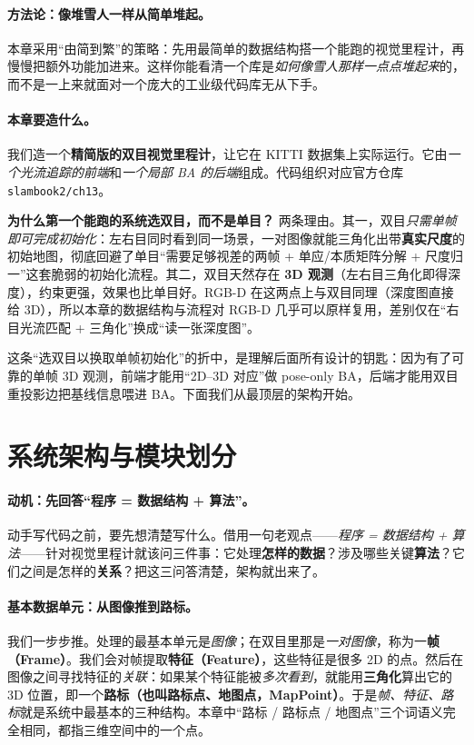 \paragraph{方法论：像堆雪人一样从简单堆起。}
本章采用“由简到繁”的策略：先用最简单的数据结构搭一个能跑的视觉里程计，再慢慢把额外功能加进来。这样你能看清一个库是\emph{如何像雪人那样一点点堆起来}的，而不是一上来就面对一个庞大的工业级代码库无从下手。

\paragraph{本章要造什么。}
我们造一个\textbf{精简版的双目视觉里程计}，让它在 KITTI 数据集上实际运行。它由\emph{一个光流追踪的前端}和\emph{一个局部 BA 的后端}组成。代码组织对应官方仓库 \texttt{slambook2/ch13}。

\begin{insight}
\textbf{为什么第一个能跑的系统选双目，而不是单目？}
两条理由。其一，双目\emph{只需单帧即可完成初始化}：左右目同时看到同一场景，一对图像就能三角化出带\textbf{真实尺度}的初始地图，彻底回避了单目“需要足够视差的两帧 + 单应/本质矩阵分解 + 尺度归一”这套脆弱的初始化流程。其二，双目天然存在 \textbf{3D 观测}（左右目三角化即得深度），约束更强，效果也比单目好。RGB-D 在这两点上与双目同理（深度图直接给 3D），所以本章的数据结构与流程对 RGB-D 几乎可以原样复用，差别仅在“右目光流匹配 + 三角化”换成“读一张深度图”。
\end{insight}

这条“选双目以换取单帧初始化”的折中，是理解后面所有设计的钥匙：因为有了可靠的单帧 3D 观测，前端才能用“2D--3D 对应”做 pose-only BA，后端才能用双目重投影边把基线信息喂进 BA。下面我们从最顶层的架构开始。

\section{系统架构与模块划分}
\label{sec:sys-arch}

\paragraph{动机：先回答“程序 = 数据结构 + 算法”。}
动手写代码之前，要先想清楚写什么。借用一句老观点——\emph{程序 = 数据结构 + 算法}——针对视觉里程计就该问三件事：它处理\textbf{怎样的数据}？涉及哪些关键\textbf{算法}？它们之间是怎样的\textbf{关系}？把这三问答清楚，架构就出来了。

\paragraph{基本数据单元：从图像推到路标。}
我们一步步推。处理的最基本单元是\emph{图像}；在双目里那是\emph{一对图像}，称为一\textbf{帧（Frame）}。我们会对帧提取\textbf{特征（Feature）}，这些特征是很多 2D 的点。然后在图像之间寻找特征的\emph{关联}：如果某个特征能被\emph{多次看到}，就能用\textbf{三角化}算出它的 3D 位置，即一个\textbf{路标（也叫路标点、地图点，MapPoint）}。于是\emph{帧、特征、路标}就是系统中最基本的三种结构。本章中“路标 / 路标点 / 地图点”三个词语义完全相同，都指三维空间中的一个点。

